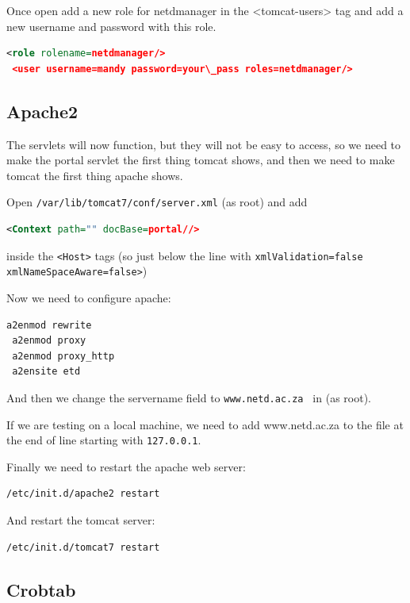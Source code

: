 \documentclass[a4paper,11pt]{article}
\begin{document}
Once open add a new role for netdmanager in the <tomcat-users> tag and add a new username and password with this role. 

\begin{lstlisting}[language=XML]
 <role rolename=netdmanager/> 
 <user username=mandy password=your\_pass roles=netdmanager/>
\end{lstlisting}

\subsection{Apache2}

The servlets will now function, but they will not be easy to access, so we need to make the portal servlet the first thing tomcat shows, and then we need to make tomcat the first thing apache shows.

Open \texttt{/var/lib/tomcat7/conf/server.xml} (as root) and add 

\begin{lstlisting}[language=XML]
 <Context path="" docBase=portal//> 
\end{lstlisting}

inside the \texttt{<Host>} tags (so just below the line with \texttt{xmlValidation=false xmlNameSpaceAware=false>})

Now we need to configure apache: 

\begin{lstlisting}[language=bash]
 a2enmod rewrite 
 a2enmod proxy 
 a2enmod proxy_http 
 a2ensite etd
\end{lstlisting}

And then we change the servername field to \texttt{www.netd.ac.za } in  (as root).

If we are testing on a local machine, we need to add www.netd.ac.za to the  file at the end of line starting with \texttt{127.0.0.1}.

Finally we need to restart the apache web server: 

\begin{lstlisting}[language=bash]
 /etc/init.d/apache2 restart
\end{lstlisting}

And restart the tomcat server: 

\begin{lstlisting}[language=bash]
 /etc/init.d/tomcat7 restart
\end{lstlisting}

\subsection{Crobtab}
\end{document}
